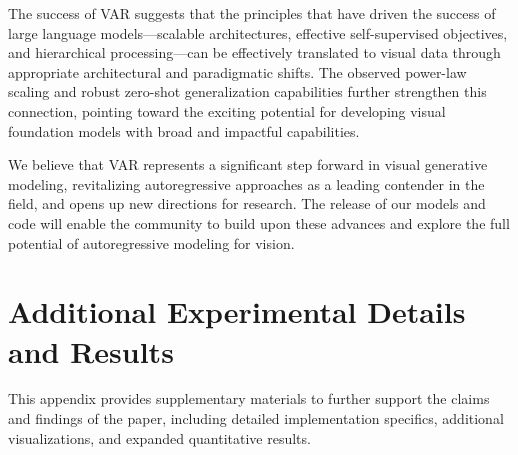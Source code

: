 \documentclass{article}
\begin{document}
The success of VAR suggests that the principles that have driven the success of large language models—scalable architectures, effective self-supervised objectives, and hierarchical processing—can be effectively translated to visual data through appropriate architectural and paradigmatic shifts. The observed power-law scaling and robust zero-shot generalization capabilities further strengthen this connection, pointing toward the exciting potential for developing visual foundation models with broad and impactful capabilities.

We believe that VAR represents a significant step forward in visual generative modeling, revitalizing autoregressive approaches as a leading contender in the field, and opens up new directions for research. The release of our models and code will enable the community to build upon these advances and explore the full potential of autoregressive modeling for vision.



\appendix
\section{Additional Experimental Details and Results}
\label{app:additional_results}
This appendix provides supplementary materials to further support the claims and findings of the paper, including detailed implementation specifics, additional visualizations, and expanded quantitative results.
\end{document}
